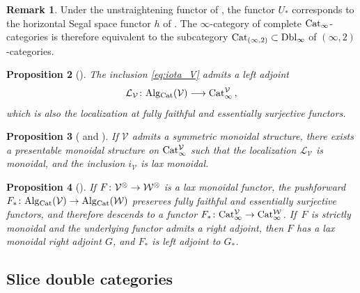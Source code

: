 \documentclass[10pt]{amsart}
\numberwithin{equation}{section}
\newtheorem{prop}{Proposition}[subsection]
\theoremstyle{definition}
\newtheorem{rem}[prop]{Remark}
\newcommand{\Cat}{\mathrm{Cat}\vphantom{t}}
\newcommand{\Alg}{\mathrm{Alg}\vphantom{z}}
\newcommand{\cV}{\mathcal{V}}
\newcommand{\cW}{\mathcal{W}}
\newcommand{\cL}{\mathcal{L}}
\newcommand{\Dbl}{\mathrm{Dbl}}
\renewcommand{\to}{\mathchoice{\longrightarrow}{\rightarrow}{}{}}
\begin{document}
	\begin{rem}\label{rem:2-cats_as_enriched}
		Under the unstraightening functor of , the functor $U_{*}$ corresponds to the horizontal Segal space functor $h$ of . The $\infty$-category of complete $\Cat_{\infty}$-categories is therefore equivalent to the subcategory $\Cat_{(\infty,2)}\subset \Dbl_{\infty}$ of $(\infty,2)$-categories.
	\end{rem}
	\begin{prop}[{\cite*[Corollary 5.5.6]{GH}}] \label{prop:CatV_localization}
		The inclusion \eqref{eq:iota_V} admits a left adjoint
		\begin{align*}
			\cL_{\cV}\colon \Alg_{\Cat}(\cV) \to \Cat^{\cV}_{\infty} \,,
		\end{align*}
		which is also the localization at fully faithful and essentially surjective functors.
	\end{prop}
	\begin{prop}[{\cite*[Proposition 5.7.14]{GH} and \cite{haugseng2023tensor}}] \label{prop:CatV_monoidal_structure}
		If $\cV$ admits a symmetric monoidal structure, there exists a presentable monoidal structure on $\Cat^{\cV}_{\infty}$ such that the localization $\cL_{\cV}$ is monoidal, and the inclusion $i_{\cV}$ is lax monoidal.
	\end{prop}
	\begin{prop}[{\cite*[Proposition 5.7.17]{GH}}] \label{prop:CatV_adjunctions}
		If $F\colon \cV^{\otimes} \to \cW^{\otimes}$ is a lax monoidal functor, the pushforward $F_{*}\colon \Alg_{\Cat}(\cV) \to \Alg_{\Cat}(\cW)$ preserves fully faithful and essentially surjective functors, and therefore descends to a functor $F_* \colon \Cat^{\cV}_{\infty} \to \Cat^{\cW}_{\infty}$.
    If~$F$ is strictly monoidal and the underlying functor admits a right adjoint, then $F$ has a lax monoidal right adjoint $G$, and $F_{*}$ is left adjoint to $G_{*}$.
	\end{prop}



	\subsection{Slice double categories}\label{subsec:slice_double_categories}
\end{document}
